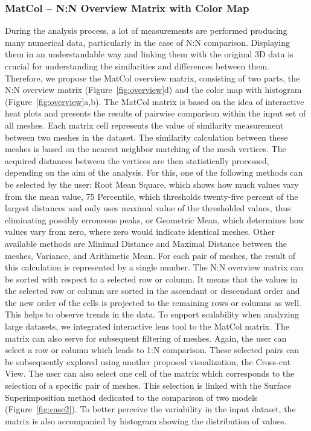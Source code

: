 \documentclass[final,5p,times]{elsarticle}
\begin{document}
\subsubsection{MatCol -- N:N Overview Matrix with Color Map}
During the analysis process, a lot of measurements are performed producing many numerical data, particularly in the case of N:N comparison.
Displaying them in an understandable way and linking them with the original 3D data is crucial for understanding the similarities and differences between them.
Therefore, we propose the MatCol overview matrix, consisting of two parts, the N:N overview matrix (Figure~\ref{fig:overview}d) and the color map with histogram (Figure~\ref{fig:overview}a,b). 
The MatCol matrix is based on the idea of interactive heat plots and presents the results of pairwise comparison within the input set of all meshes.
Each matrix cell represents the value of similarity measurement between two meshes in the dataset.
The similarity calculation between these meshes is based on the nearest neighbor matching of the mesh vertices.
The acquired distances between the vertices are then statistically processed, depending on the aim of the analysis.
For this, one of the following methods can be selected by the user: Root Mean Square, which shows how much values vary from the mean value, 75 Percentile, which thresholds twenty-five percent of the largest distances and only uses maximal value of the thresholded values, thus eliminating possibly erroneous peaks, or Geometric Mean, which determines how values vary from zero, where zero would indicate identical meshes. 
Other available methods are Minimal Distance and Maximal Distance between the meshes, Variance, and Arithmetic Mean.
For each pair of meshes, the result of this calculation is represented by a single number.
The N:N overview matrix can be sorted with respect to a selected row or column.
It means that the values in the selected row or column are sorted in the ascendant or descendant order and the new order of the cells is projected to the remaining rows or columns as well.
This helps to observe trends in the data.
To support scalability when analyzing large datasets, we integrated interactive lens tool to the MatCol matrix.
The matrix can also serve for subsequent filtering of meshes.
Again, the user can select a row or column which leads to 1:N comparison.
These selected pairs can be subsequently explored using another proposed visualization, the Cross-cut View.
The user can also select one cell of the matrix which corresponds to the selection of a specific pair of meshes.
This selection is linked with the Surface Superimposition method dedicated to the comparison of two models (Figure~\ref{fig:case2}).
To better perceive the variability in the input dataset, the matrix is also accompanied by histogram showing the distribution of values.
\end{document}
